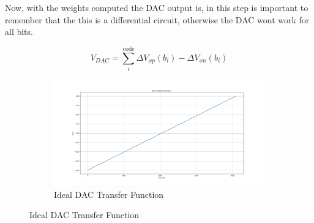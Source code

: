 Now, with the weights computed the DAC output is, in this step is important to remember that the this is a differential circuit, otherwise the DAC wont work for all bits.

\begin{equation}
    V_{DAC} = \sum_{i}^{\text{code}}\Delta V_{xp}(b_i)- \Delta V_{xn}(b_i)
    \label{eq:VDAC}
\end{equation}

\begin{figure}[H]
    \centering

    \begin{subfigure}[b]{0.9\textwidth}
        \centering
        \includegraphics[width=\textwidth]{Images/DAC_TransFunc_ideal.png}
        \caption{Ideal DAC Transfer Function}
        \label{fig:DAC_TF}
    \end{subfigure}%


\end{figure}
